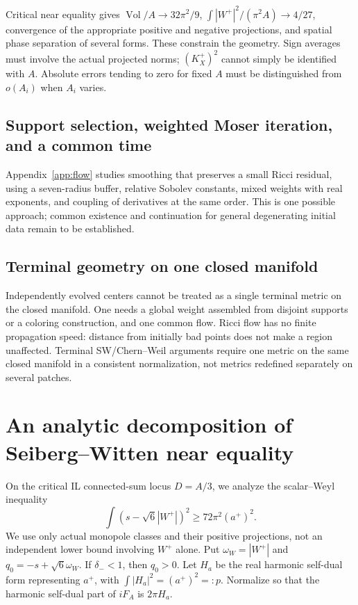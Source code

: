 \documentclass[a4paper,11pt]{article}
\numberwithin{equation}{section}
\theoremstyle{definition}
\newcommand{\Vol}{\operatorname{Vol}}
\begin{document}
Critical near equality gives $\Vol/A\to32\pi^2/9$, $\int|W^+|^2/(\pi^2A)\to4/27$, convergence of the appropriate positive and negative projections, and spatial phase separation of several forms. These constrain the geometry. Sign averages must involve the actual projected norms; $(K_X^+)^2$ cannot simply be identified with $A$. Absolute errors tending to zero for fixed $A$ must be distinguished from $o(A_i)$ when $A_i$ varies.

\subsection{Support selection, weighted Moser iteration, and a common time}
Appendix~\ref{app:flow} studies smoothing that preserves a small Ricci residual, using a seven-radius buffer, relative Sobolev constants, mixed weights with real exponents, and coupling of derivatives at the same order. This is one possible approach; common existence and continuation for general degenerating initial data remain to be established.

\subsection{Terminal geometry on one closed manifold}
Independently evolved centers cannot be treated as a single terminal metric on the closed manifold. One needs a global weight assembled from disjoint supports or a coloring construction, and one common flow. Ricci flow has no finite propagation speed: distance from initially bad points does not make a region unaffected. Terminal SW/Chern--Weil arguments require one metric on the same closed manifold in a consistent normalization, not metrics redefined separately on several patches.

\section{An analytic decomposition of Seiberg--Witten near equality}
On the critical IL connected-sum locus $D=A/3$, we analyze the scalar--Weyl inequality
\begin{equation}\label{eq:primitiveSW}
\int(s-\sqrt6|W^+|)^2\ge72\pi^2(a^+)^2.
\end{equation}
We use only actual monopole classes and their positive projections, not an independent lower bound involving $W^+$ alone.
Put $\omega_W=|W^+|$ and $q_0=-s+\sqrt6\omega_W$.
If $\delta_-<1$, then $q_0>0$.
Let $H_a$ be the real harmonic self-dual form representing $a^+$, with
$\int|H_a|^2=(a^+)^2=:p$. Normalize so that the harmonic self-dual part of $iF_A$ is $2\pi H_a$.
\end{document}

